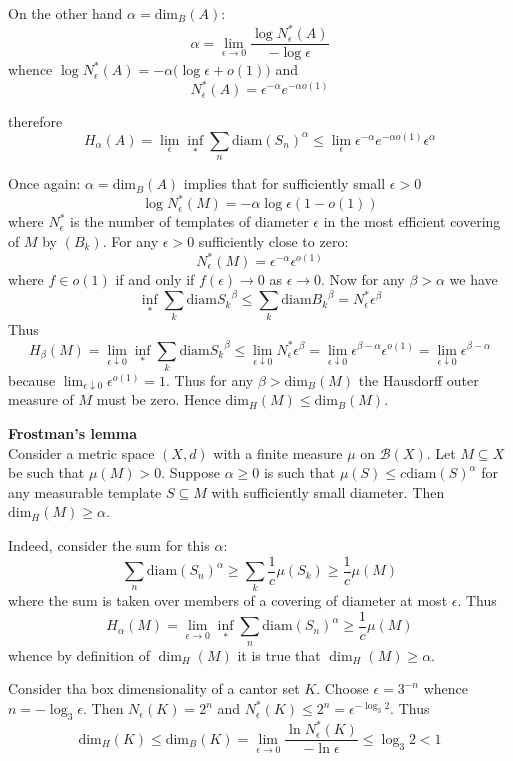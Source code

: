 \documentclass[a4paper]{article}
\begin{document}
On the other hand $\alpha = \text{dim}_B(A)$:
\[\alpha = \lim_{\epsilon\to 0}\frac{\log N^*_\epsilon(A)}{-\log \epsilon}\]
whence $\log N^*_\epsilon(A) = -\alpha \big(\log \epsilon + o(1)\big)$ and
\[N^*_\epsilon(A) = \epsilon^{-\alpha}e^{-\alpha o(1)}\]

therefore
\[H_\alpha(A) = \lim_{\epsilon} \inf_{*} \sum_n \text{diam}(S_n)^\alpha \leq \lim_{\epsilon} \epsilon^{-\alpha}e^{-\alpha o(1)} \epsilon^\alpha \]

Once again: $\alpha = \text{dim}_B(A)$ implies that for sufficiently small $\epsilon>0$
\[\log N_\epsilon^*(M) = -\alpha \log \epsilon (1 - o(1)) \]
where $N_\epsilon^*$ is the number of templates of diameter $\epsilon$ in the most
efficient covering of $M$ by $(B_k)$. For any $\epsilon>0$ sufficiently close
to zero:
\[ N_\epsilon^*(M) = \epsilon^{-\alpha} \epsilon^{o(1)}\]
where $f\in o(1)$ if and only if $f(\epsilon)\to 0$ as $\epsilon\to0$.
Now for any $\beta>\alpha$ we have
\[
\inf_* \sum_k\text{diam}{S_k}^\beta
\leq \sum_k\text{diam}{B_k}^\beta
= N_\epsilon^* \epsilon^\beta
\]
Thus
\[
H_\beta(M)
= \lim_{\epsilon\downarrow0} \inf_* \sum_k\text{diam}{S_k}^\beta
\leq \lim_{\epsilon\downarrow0} N_\epsilon^* \epsilon^\beta
= \lim_{\epsilon\downarrow0} \epsilon^{\beta-\alpha} \epsilon^{o(1)}
= \lim_{\epsilon\downarrow0} \epsilon^{\beta-\alpha}
\]
because $\lim_{\epsilon\downarrow0} \epsilon^{o(1)} = 1$.
Thus for any $\beta > \text{dim}_B(M)$ the Hausdorff outer measure of $M$ must be
zero. Hence $\text{dim}_H(M)\leq \text{dim}_B(M)$.


\noindent\textbf{Frostman's lemma}\hfill\\
Consider a metric space $(X,d)$ with a finite measure $\mu$ on $\mathcal{B}(X)$. Let $M\subseteq X$ be such that $\mu(M) > 0$. Suppose $\alpha\geq 0$ is such that $\mu(S) \leq c \text{diam}(S)^\alpha$ for any measurable template $S\subseteq M$ with sufficiently small diameter. Then $\text{dim}_H(M) \geq \alpha$.

Indeed, consider the sum for this $\alpha$:
\[\sum_n \text{diam}(S_n)^\alpha \geq \sum_k \frac{1}{c} \mu(S_k) \geq \frac{1}{c} \mu(M)\]
where the sum is taken over members of a covering of diameter at most $\epsilon$. Thus
\[H_\alpha(M) = \lim_{\epsilon\to 0}\inf_* \sum_n \text{diam}(S_n)^\alpha \geq \frac{1}{c} \mu(M)\]
whence by definition of $\dim_H(M)$ it is true that $\dim_H(M) \geq \alpha$.


Consider tha box dimensionality of a cantor set $K$.
Choose $\epsilon = 3^{-n}$ whence $n=-\log_3 \epsilon$. Then $N_\epsilon(K) = 2^n$ and $N_\epsilon^*(K) \leq 2^n = \epsilon^{-\log_3 2}$. Thus
\[\text{dim}_H(K) \leq \text{dim}_B(K) = \lim_{\epsilon\to 0}\frac{\ln N_\epsilon^*(K)}{-\ln \epsilon}\leq \log_3 2 < 1\]
\end{document}
